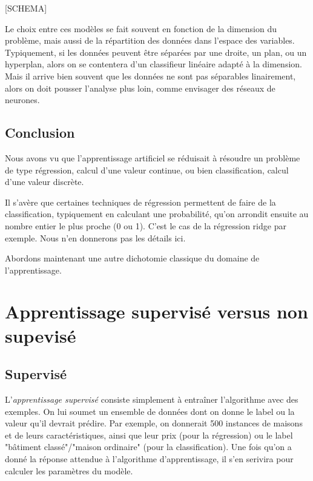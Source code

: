 [SCHEMA]

Le choix entre ces modèles se fait souvent en fonction de la dimension du problème, mais aussi de la répartition des données dans l'espace des variables. Typiquement, si les données peuvent être séparées par une droite, un plan, ou un hyperplan, alors on se contentera d'un classifieur linéaire adapté à la dimension. Mais il arrive bien souvent que les données ne sont pas séparables linairement, alors on doit pousser l'analyse plus loin, comme envisager des réseaux de neurones.


\subsection{Conclusion}
Nous avons vu que l'apprentissage artificiel se réduisait à résoudre un problème de type régression, calcul d'une valeur continue, ou bien classification, calcul d'une valeur discrète.

Il s'avère que certaines techniques de régression permettent de faire de la classification, typiquement en calculant une probabilité, qu'on arrondit ensuite au nombre entier le plus proche (0 ou 1). C'est le cas de la régression ridge par exemple. Nous n'en donnerons pas les détails ici.

Abordons maintenant une autre dichotomie classique du domaine de l'apprentissage.

\section{Apprentissage supervisé versus non supevisé}
\subsection{Supervisé}
L'\emph{apprentissage supervisé} consiste simplement à entraîner l'algorithme avec des exemples. On lui soumet un ensemble de données dont on donne le label ou la valeur qu'il devrait prédire. Par exemple, on donnerait 500 instances de maisons et de leurs caractéristiques, ainsi que leur prix (pour la régression) ou le label "bâtiment classé"/"maison ordinaire" (pour la classification). Une fois qu'on a donné la réponse attendue à l'algorithme d'apprentissage, il s'en serivira pour calculer les paramètres du modèle.

